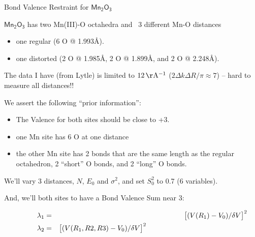 \begin{slide}{Bond Valence Restraint for {$\mathsf{Mn_2O_3}$}}
    
    \vmm 
    
    $\mathsf{Mn_2O_3}$ has two Mn(III)-O octahedra and ~3 different Mn-O
    distances
    \begin{itemize}
    \item one regular   (6 O @ 1.993\AA).
    \item one distorted ({2 O @ 1.985\AA, 2 O @ 1.899\AA,  and  2 O @ 2.248\AA}). 
    \end{itemize}
    
    The data I have (from Lytle) is limited to $12\rm\mathsf\,\AA^{-1}$ ($2\Delta k
    \Delta R/\pi \approx 7$) -- hard to measure all distances!! 
    
    \vmm 
    \begin{center}
    \end{center}

\ThinGreyLine

We assert the following ``prior information'':
\begin{itemize}
\item The Valence for both sites should be close to  +3.
\item one Mn site has 6 O at one distance 
\item the other Mn site has 2 bonds that are the same length as the regular 
  octahedron, 2 ``short'' O bonds, and 2 ``long'' O bonds.
\end{itemize}

We'll vary 3 distances, $N$, $E_0$ and $\sigma^2$, and set $S_0^2$ to 0.7
(6 variables).

\ThinGreyLine

And, we'll {} both sites to have a Bond Valence Sum near 3:

\vspace{-3mm}

\begin{eqnarray*}  \hspace{10mm}
  \lambda_1 &=& \bigl[ {{({V(R_1) - {V_0}})}/ {{{\delta V}}}} \bigr]^2
  \hfill \\
  \lambda_2 &=& \bigl[ {{({V(R_1,R2,R3) - {V_0}})}/ {{{\delta V}}}} \bigr]^2
  \hspace{50mm} \hfill \\
\end{eqnarray*}
   

\vfill  
\end{slide} %



